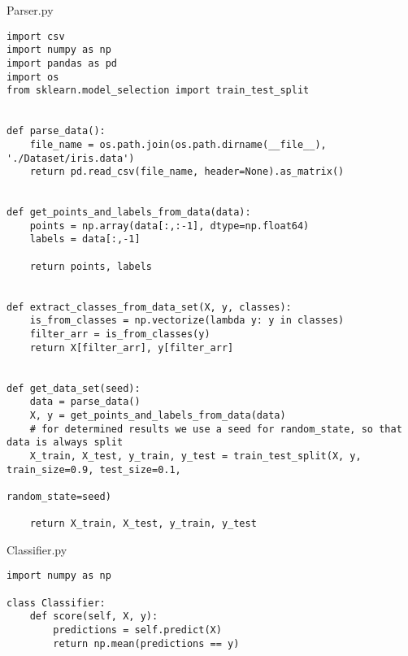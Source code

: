 Parser.py
\begin{lstlisting}[style=py]
import csv
import numpy as np
import pandas as pd
import os
from sklearn.model_selection import train_test_split


def parse_data():
    file_name = os.path.join(os.path.dirname(__file__), './Dataset/iris.data')
    return pd.read_csv(file_name, header=None).as_matrix()


def get_points_and_labels_from_data(data):
    points = np.array(data[:,:-1], dtype=np.float64)
    labels = data[:,-1]

    return points, labels


def extract_classes_from_data_set(X, y, classes):
    is_from_classes = np.vectorize(lambda y: y in classes)
    filter_arr = is_from_classes(y)
    return X[filter_arr], y[filter_arr]


def get_data_set(seed):
    data = parse_data()
    X, y = get_points_and_labels_from_data(data)
    # for determined results we use a seed for random_state, so that data is always split
    X_train, X_test, y_train, y_test = train_test_split(X, y, train_size=0.9, test_size=0.1,
                                                        random_state=seed)

    return X_train, X_test, y_train, y_test

\end{lstlisting}

Classifier.py
\begin{lstlisting}[style=py]
import numpy as np

class Classifier:
    def score(self, X, y):
        predictions = self.predict(X)
        return np.mean(predictions == y)

\end{lstlisting}



